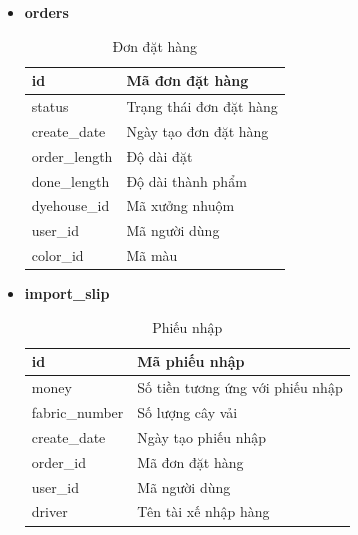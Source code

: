 \begin{itemize}
    \item \textbf{orders}
    \begin{table}[H]
        \centering
        \begin{tabular}{|m{3cm}|m{10cm}|}
        \hline 
            id & Mã đơn đặt hàng\\ \hline
            status & Trạng thái đơn đặt hàng \\ \hline
            create\_date & Ngày tạo đơn đặt hàng \\ \hline
            order\_length & Độ dài đặt\\ \hline
            done\_length & Độ dài thành phẩm\\ \hline
            dyehouse\_id & Mã xưởng nhuộm\\ \hline
            user\_id & Mã người dùng\\ \hline
            color\_id & Mã màu\\
        \hline 
        \end{tabular}
        \caption{Đơn đặt hàng}
        \label{orders}
    \end{table}
    
    \newpage
    \item \textbf{import\_slip}
    \begin{table}[H]
        \centering
        \begin{tabular}{|m{3cm}|m{10cm}|}
        \hline 
            id & Mã phiếu nhập\\ \hline
            money & Số tiền tương ứng với phiếu nhập \\ \hline
            fabric\_number & Số lượng cây vải\\ \hline
            create\_date & Ngày tạo phiếu nhập \\ \hline
            order\_id & Mã đơn đặt hàng\\ \hline
            user\_id & Mã người dùng\\ \hline
            driver & Tên tài xế nhập hàng\\
        \hline 
        \end{tabular}
        \caption{Phiếu nhập}
        \label{import_slip}
    \end{table}
    

\end{itemize}
